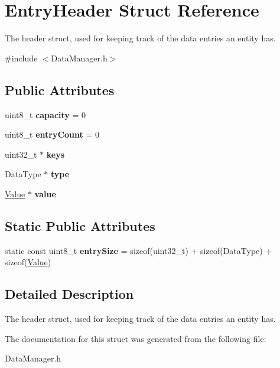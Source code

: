 \hypertarget{struct_entry_header}{}\section{Entry\+Header Struct Reference}
\label{struct_entry_header}


The header struct, used for keeping track of the data entries an entity has.  




{\ttfamily \#include $<$Data\+Manager.\+h$>$}

\subsection*{Public Attributes}
\begin{DoxyCompactItemize}
\item 
\mbox{\label{struct_entry_header_acfcb10ed50b0d15f505190e7d910cf69}} 
uint8\+\_\+t {\bfseries capacity} = 0
\item 
\mbox{\label{struct_entry_header_a56d4ff58e67c102bc4b8118d86e6e504}} 
uint8\+\_\+t {\bfseries entry\+Count} = 0
\item 
\mbox{\label{struct_entry_header_a7620d0e6d0cb2afd97b9a1fde91bb654}} 
uint32\+\_\+t $\ast$ {\bfseries keys}
\item 
\mbox{\label{struct_entry_header_aa276141bf2d7f7c713dd83b74fa383ba}} 
Data\+Type $\ast$ {\bfseries type}
\item 
\mbox{\label{struct_entry_header_a317420953c3218c807ead512aca65eb2}} 
\hyperlink{struct_value}{Value} $\ast$ {\bfseries value}
\end{DoxyCompactItemize}
\subsection*{Static Public Attributes}
\begin{DoxyCompactItemize}
\item 
\mbox{\label{struct_entry_header_a91cc6cc53461d67b73284bf499767e07}} 
static const uint8\+\_\+t {\bfseries entry\+Size} = sizeof(uint32\+\_\+t) + sizeof(Data\+Type) + sizeof(\hyperlink{struct_value}{Value})
\end{DoxyCompactItemize}


\subsection{Detailed Description}
The header struct, used for keeping track of the data entries an entity has. 

The documentation for this struct was generated from the following file\+:\begin{DoxyCompactItemize}
\item 
Data\+Manager.\+h\end{DoxyCompactItemize}
